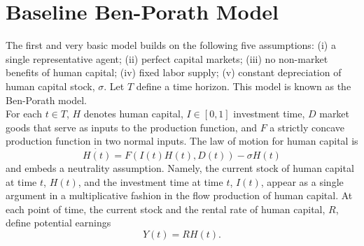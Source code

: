 \section{Baseline Ben-Porath Model} \label{section:baseline}
\noindent The first and very basic model builds on the following five assumptions: (i) a single representative agent; (ii) perfect capital markets; (iii) no non-market benefits of human capital; (iv) fixed labor supply; (v) constant depreciation of human capital stock, $\sigma$. Let $T$ define a time horizon. This model is known as the Ben-Porath model.\\
\indent For each $t \in T$, $H$ denotes human capital, $I \in [0,1]$ investment time, $D$ market goods that serve as inputs to the production function, and $F$ a strictly concave production function in two normal inputs. The law of motion for human capital is
\begin{equation}
\dot{H(t)} = F \left( I(t) H(t), D(t) \right) - \sigma H(t) \label{eq:lawh}
\end{equation}
and embeds a neutrality assumption. Namely, the current stock of human capital at time $t$, $H(t)$, and the investment time at time $t$, $I(t)$, appear as a single argument in a multiplicative fashion in the flow production of human capital. At each point of time, the current stock and the rental rate of human capital, $R$, define potential earnings
\begin{equation}
Y(t) = R H(t).
\end{equation}

